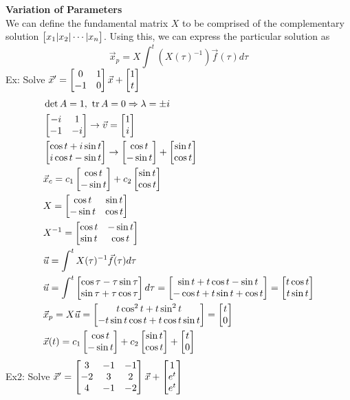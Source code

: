\documentclass[11pt, fleqn]{article}
\begin{document}
\textbf{Variation of Parameters}\\
We can define the fundamental matrix $X$ to be comprised of the complementary solution $\matrixx{x_1|x_2|\cdots|x_n}$. Using this, we can express the particular solution as
$$\vec{x}_p=X\int^t(X(\tau)^{-1})\vec{f}(\tau)d\tau$$
Ex: Solve $\vec{x}'=\matrixx{0&1\\-1&0}\vec{x}+\matrixx{1\\t}$
\begin{align*}
    &\det A=1,\ \trace A=0\Ra \lambda = \pm i\\
    &\matrixx{-i&1\\-1&-i}\to\vec{v}=\matrixx{1\\i}\\
    &\matrixx{\cos t+i\sin t\\i\cos t-\sin t}\to\matrixx{\cos t\\-\sin t}+\matrixx{\sin t\\\cos t}\\
    &\vec{x}_c=c_1\matrixx{\cos t\\-\sin t}+c_2\matrixx{\sin t\\\cos t}\\
    &X=\matrixx{\cos t&\sin t\\-\sin t&\cos t}\\
    &X^{-1}=\matrixx{\cos t&-\sin t\\\sin t&\cos t}\\
    &\vec{u}=\int^tX(\tau)^{-1}\vec{f}(\tau)d\tau\\
    &\vec{u}=\int^t\matrixx{\cos \tau-\tau\sin \tau\\\sin \tau+\tau\cos \tau}d\tau=\matrixx{\sin t+t\cos t-\sin t\\-\cos t+t\sin t+\cos t}=\matrixx{t\cos t\\ t\sin t}\\
    &\vec{x}_p=X\vec{u}=\matrixx{t\cos^2t+t\sin^2t\\-t\sin t\cos t+t\cos t\sin t}=\matrixx{t\\0}\\
    &\vec{x}(t)=c_1\matrixx{\cos t\\-\sin t}+c_2\matrixx{\sin t\\\cos t}+\matrixx{t\\0}
\end{align*}
Ex2: Solve $\vec{x}'=\matrixx{3&-1&-1\\-2&3&2\\4&-1&-2}\vec{x}+\matrixx{1\\e^t\\e^t}$
\end{document}
